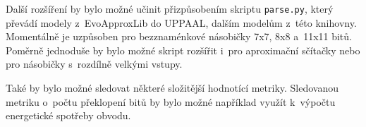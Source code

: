 Další rozšíření by bylo možné učinit přizpůsobením skriptu \texttt{parse.py}, který převádí modely z~EvoApproxLib do UPPAAL, dalším modelům z~této knihovny. Momentálně je uzpůsoben pro bezznaménkové násobičky 7x7, 8x8 a~11x11 bitů. Poměrně jednoduše by bylo možné skript rozšířit i~pro aproximační sčítačky nebo pro násobičky s~rozdílně velkými vstupy.

Také by bylo možné sledovat některé složitější hodnotící metriky. Sledovanou metriku o~počtu překlopení bitů by bylo možné například využít k~výpočtu energetické spotřeby obvodu.




%

